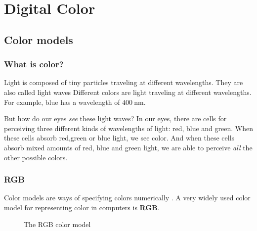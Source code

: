 \begin{comment}
  
\end{comment}

\chapter{Digital Color}
\label{cha:color}

\begin{refsection}

  \section{Color models}
  \label{sec:color-models}

  \subsection{What is color?}
  \label{sec:what-color}

  \newcommand{\bluewave}{\ensuremath{\SI{400}{\nano\meter}}}

  Light is composed of tiny particles traveling at different
  wavelengths. They are also called light
  waves \cite{neider93:_openg_progr_guide}
  Different colors are light traveling at different wavelengths. For
  example, blue has a wavelength of
  \bluewave. \cite{ohlsson99:_digit_bild_kreat}

  But how do our eyes \textit{see} these light waves? In our eyes,
  there are cells for perceiving three different kinds of wavelengths
  of light: red, blue and green. When these cells absorb red,green or
  blue light, we see color. And when these cells absorb mixed amounts
  of red, blue and green light, we are able to perceive \textit{all}
  the other possible colors.

  \subsection{RGB}
  \label{sec:rgb}

  Color models are ways of specifying colors
  numerically \cite{fadgi11:color_model}. A very widely used color
  model for representing color in computers is \textbf{RGB}.

  \begin{figure}[h]
    \centering
    \caption{The RGB color model}
    \label{fig:rgb}
  \end{figure}


\end{refsection}
